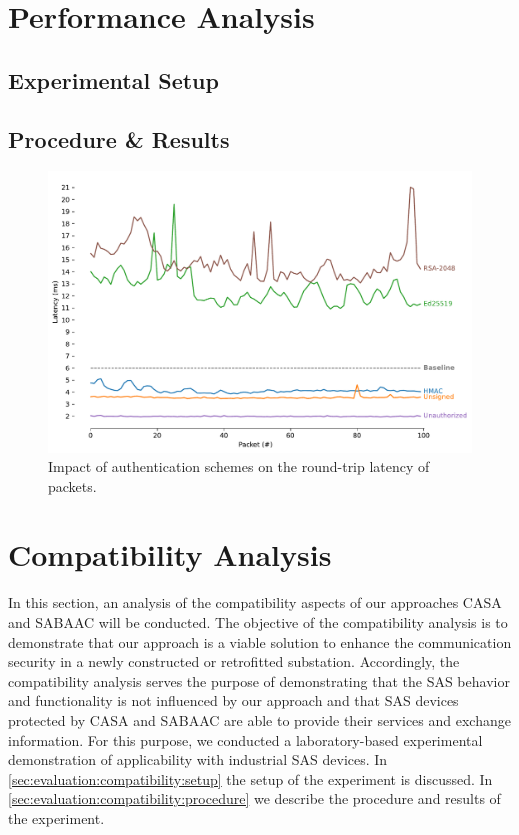 \section{Performance Analysis}
\subsection{Experimental Setup}
\subsection{Procedure \& Results}
\begin{figure}
    \centering
    \includegraphics[width=1.0\linewidth]{figures/rtt-estimation-results.pdf}
    \caption{Impact of authentication schemes on the round-trip latency of packets.}
    \label{fig:rtt_estimation_results}
\end{figure}

\section{Compatibility Analysis}
In this section, an analysis of the compatibility aspects of our approaches CASA and SABAAC will be conducted.
The objective of the compatibility analysis is to demonstrate that our approach is a viable solution to enhance the communication security in a newly constructed or retrofitted substation.
Accordingly, the compatibility analysis serves the purpose of demonstrating that the SAS behavior and functionality is not influenced by our approach and that SAS devices protected by CASA and SABAAC are able to provide their services and exchange information.
For this purpose, we conducted a laboratory-based experimental demonstration of applicability with industrial SAS devices.
In \autoref{sec:evaluation:compatibility:setup} the setup of the experiment is discussed.
In \autoref{sec:evaluation:compatibility:procedure} we describe the procedure and results of the experiment.

